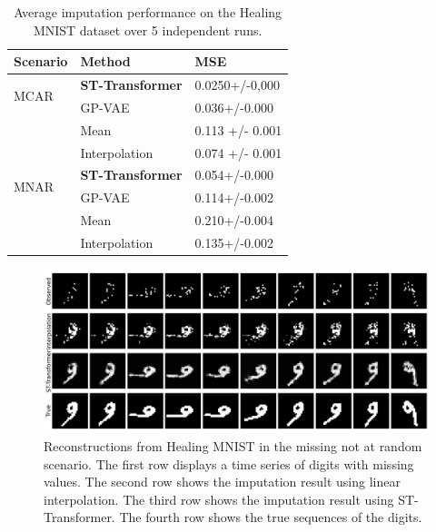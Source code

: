 \documentclass[11pt]{article}
\begin{document}
\begin{table}[h!]
    \centering
    \begin{tabularx}{\textwidth}{XXX}
        \toprule
        Scenario&Method & MSE \\
        \midrule
        \multirow{2}{*}{MCAR}&\textbf{ST-Transformer} & 0.0250+/-0,000   \\

        &GP-VAE& 0.036+/-0.000\\
        &Mean&0.113 +/- 0.001\\
        &Interpolation&0.074 +/- 0.001\\
        
        \midrule
          \multirow{2}{*}{MNAR}&\textbf{ST-Transformer} & 0.054+/-0.000  \\
        &GP-VAE&0.114+/-0.002\\
        &Mean&0.210+/-0.004\\
        &Interpolation& 0.135+/-0.002\\
        \bottomrule

        
    \end{tabularx}
    \caption{Average imputation performance on the Healing MNIST dataset over 5 independent runs.}
    \label{tab: healing_mnist}
\end{table}








\begin{figure}[H]
\centering
\includegraphics[width=\textwidth]{figure/healing_mnist.png}
\caption{Reconstructions from Healing MNIST in the missing not at random scenario. The first row displays a time series of digits with missing values. The second row shows the imputation result using linear interpolation. The third row shows the imputation result using ST-Transformer. The fourth row shows the true sequences of the digits.}
\label{fig: healing_mnist}
\end{figure}
\end{document}
